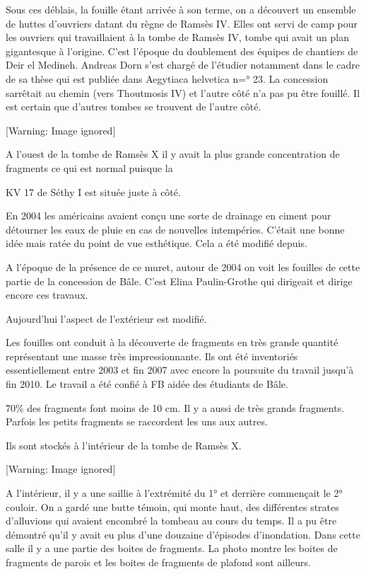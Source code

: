\documentclass{article}
\begin{document}
Sous ces déblais, la fouille étant arrivée à son terme, on a découvert
un ensemble de huttes d’ouvriers datant du règne de Ramsès IV. Elles
ont servi de camp pour les ouvriers qui travaillaient à la tombe de
Ramsès IV, tombe qui avait un plan gigantesque à l’origine. C’est
l’époque du doublement des équipes de chantiers de Deir el Medineh.
Andreas Dorn s’est chargé de l’étudier notamment dans le cadre de sa
thèse  qui est publiée dans Aegytiaca helvetica n=° 23. La concession
s{\textquotesingle}arrêtait au chemin (vers Thoutmosis IV) et l’autre
côté n’a pas pu être fouillé. Il est certain que d’autres tombes se
trouvent de l’autre côté.  

  [Warning: Image ignored] %
 

A l’ouest de la tombe de Ramsès X il y avait la plus grande
concentration de fragments ce qui est normal puisque la  

KV 17 de Séthy I est située juste à côté.

En 2004 les américains avaient conçu une sorte de drainage en ciment
pour détourner les eaux de pluie en cas de nouvelles intempéries.
C’était une bonne idée mais ratée du point de vue esthétique. Cela a
été modifié depuis. 

A l’époque de la présence de ce muret, autour de 2004 on voit les
fouilles de cette partie de la concession de Bâle. C’est Elina
Paulin-Grothe qui dirigeait et dirige encore ces travaux.

Aujourd’hui l’aspect de l’extérieur est modifié.

Les fouilles ont conduit à la découverte de fragments en très grande
quantité représentant une masse très  impressionnante. Ils ont été
inventoriés essentiellement entre 2003 et fin 2007 avec encore la
poursuite du travail jusqu’à fin 2010. Le travail a été confié à FB
aidée des étudiants de Bâle.

70\% des fragments font moins de 10 cm. Il y a aussi de très grands
fragments. Parfois les petits fragments se raccordent les uns aux
autres. 

Ils sont stockés à l’intérieur de la tombe de Ramsès X. 

  [Warning: Image ignored] %
 

A l’intérieur, il y a une saillie à l’extrémité du 1° et derrière
commençait le 2° couloir. On a gardé une butte témoin, qui monte haut,
des différentes strates d’alluvions qui avaient encombré la tombeau au
cours du temps. Il a pu être démontré qu’il y avait eu plus d’une
douzaine d’épisodes d’inondation. Dans cette salle il y a une partie
des boites de fragments. La photo montre les boites de fragments de
parois et les boites de fragments de plafond sont ailleurs. 
\end{document}

